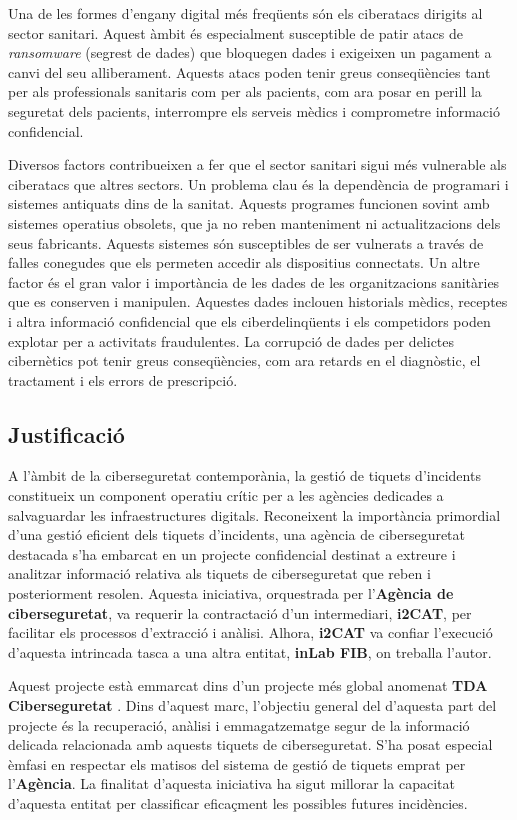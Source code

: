 Una de les formes d'engany digital més freqüents són els ciberatacs dirigits al sector sanitari. Aquest àmbit és especialment susceptible de patir atacs de \textit{ransomware} (segrest de dades) que bloquegen dades i exigeixen un pagament a canvi del seu alliberament. Aquests atacs poden tenir greus conseqüències tant per als professionals sanitaris com per als pacients, com ara posar en perill la seguretat dels pacients, interrompre els serveis mèdics i comprometre informació confidencial.

Diversos factors contribueixen a fer que el sector sanitari sigui més vulnerable als ciberatacs que altres sectors. Un problema clau és la dependència de programari i sistemes antiquats dins de la sanitat. Aquests programes funcionen sovint amb sistemes operatius obsolets, que ja no reben manteniment ni actualitzacions dels seus fabricants. Aquests sistemes són susceptibles de ser vulnerats a través de falles conegudes que els permeten accedir als dispositius connectats. Un altre factor és el gran valor i importància de les dades de les organitzacions sanitàries que es conserven i manipulen. Aquestes dades inclouen historials mèdics, receptes i altra informació confidencial que els ciberdelinqüents i els competidors poden explotar per a activitats fraudulentes. La corrupció de dades per delictes cibernètics pot tenir greus conseqüències, com ara retards en el diagnòstic, el tractament i els errors de prescripció.

\subsection{Justificació}
A l'àmbit de la ciberseguretat contemporània, la gestió de tiquets d'incidents constitueix un component operatiu crític per a les agències dedicades a salvaguardar les infraestructures digitals. Reconeixent la importància primordial d'una gestió eficient dels tiquets d'incidents, una agència de ciberseguretat destacada s'ha embarcat en un projecte confidencial destinat a extreure i analitzar informació relativa als tiquets de ciberseguretat que reben i posteriorment resolen. Aquesta iniciativa, orquestrada per l'\textbf{Agència de ciberseguretat}, va requerir la contractació d'un intermediari, \textbf{i2CAT}, per facilitar els processos d'extracció i anàlisi. Alhora, \textbf{i2CAT} va confiar l'execució d'aquesta intrincada tasca a una altra entitat, \textbf{inLab FIB}, on treballa l'autor.

Aquest projecte està emmarcat dins d'un projecte més global anomenat \textbf{TDA Ciberseguretat} \cite{tda} \cite{tda_i2cat}. Dins d'aquest marc, l'objectiu general del d'aquesta part del projecte és la recuperació, anàlisi i emmagatzematge segur de la informació delicada relacionada amb aquests tiquets de ciberseguretat. S'ha posat especial èmfasi en respectar els matisos del sistema de gestió de tiquets emprat per l'\textbf{Agència}. La finalitat d'aquesta iniciativa ha sigut millorar la capacitat d'aquesta entitat per classificar eficaçment les possibles futures incidències.


